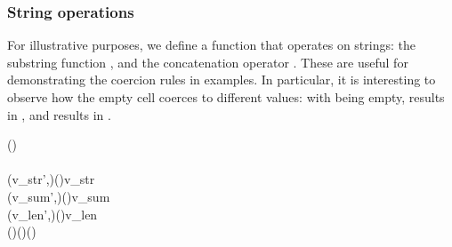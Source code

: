 \subsubsection{String operations}

For illustrative purposes, we define a function that operates on strings: the
substring function , and the concatenation operator . These are useful
for demonstrating the coercion rules in examples. In particular, it is
interesting to observe how the empty cell coerces to different values: with
 being empty,  results in , and  results in
.

\begin{hscode}\SaveRestoreHook
{}%
%
%
%
%
%
%
%
%
\>[B]{}\;\;\;(\;)\mathrel{=}{}\<[E]%
\\
\>[B]{}\<[4]%
\>[4]{}\<[E]%
\\
\>[4]{}\<[7]%
\>[7]{}(v_{str}',{}\<[18]%
\>[18]{}){}\<[26]%
\>[26]{}\mathrel{=}\<[38]%
\>[38]{}\mathbin{\$}(\;)\;\;\;{}\<[62]%
\>[62]{}v_{str}{}\<[E]%
\\
\>[4]{}\<[7]%
\>[7]{}(v_{sum}',{}\<[18]%
\>[18]{}){}\<[26]%
\>[26]{}\mathrel{=}\<[38]%
\>[38]{}\mathbin{\$}(\;)\;\;\;{}\<[62]%
\>[62]{}v_{sum}{}\<[E]%
\\
\>[4]{}\<[7]%
\>[7]{}(v_{len}',{}\<[18]%
\>[18]{}){}\<[26]%
\>[26]{}\mathrel{=}\<[38]%
\>[38]{}\mathbin{\$}(\;)\;\;\;{}\<[62]%
\>[62]{}v_{len}{}\<[E]%
\\[\blanklineskip]%
\>[4]{}\<[7]%
\>[7]{}\;(\;)\;(\;)\;(\;)\mathrel{=}{}\<[E]%

\end{hscode}
